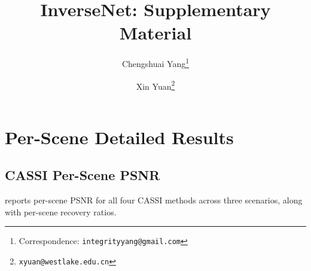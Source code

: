 \documentclass[runningheads]{llncs}
\begin{document}
\title{InverseNet: Supplementary Material}
\author{Chengshuai Yang\thanks{Correspondence: \texttt{integrityyang@gmail.com}} \and Xin Yuan\thanks{\texttt{xyuan@westlake.edu.cn}}}
\maketitle

\section{Per-Scene Detailed Results}
\label{sec:per_scene}

\subsection{CASSI Per-Scene PSNR}

 reports per-scene PSNR for all four CASSI methods across three scenarios, along with per-scene recovery ratios.
\end{document}
